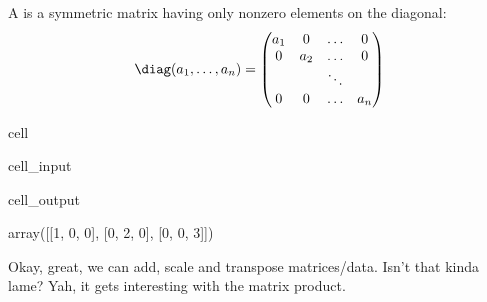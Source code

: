 \documentclass[letterpaper,10pt,english]{jupyterBook}
\begin{document}
\sphinxAtStartPar
A  is a symmetric matrix having only nonzero elements on the diagonal:
\begin{equation*}
\begin{split}\diag(a_1,\ldots, a_n) = 
    \begin{pmatrix}a_1 & 0 & \ldots & 0 \\
    0 & a_2 &\ldots & 0\\
      &     & \ddots &\\
    0 & 0   & \ldots & a_n\end{pmatrix}\end{split}
\end{equation*}

\begin{sphinxuseclass}{cell}\begin{sphinxVerbatimInput}

\begin{sphinxuseclass}{cell_input}
\begin{sphinxVerbatim}[commandchars=\\\{\}]
\PYG{p}{[}\PYG{p}{]}
\end{sphinxVerbatim}

\end{sphinxuseclass}\end{sphinxVerbatimInput}
\begin{sphinxVerbatimOutput}

\begin{sphinxuseclass}{cell_output}
\begin{sphinxVerbatim}[commandchars=\\\{\}]
array([[1, 0, 0],
       [0, 2, 0],
       [0, 0, 3]])
\end{sphinxVerbatim}

\end{sphinxuseclass}\end{sphinxVerbatimOutput}

\end{sphinxuseclass}
\sphinxAtStartPar
Okay, great, we can add, scale and transpose matrices/data. Isn’t that kinda lame?
Yah, it gets interesting with the matrix product.
\end{document}
